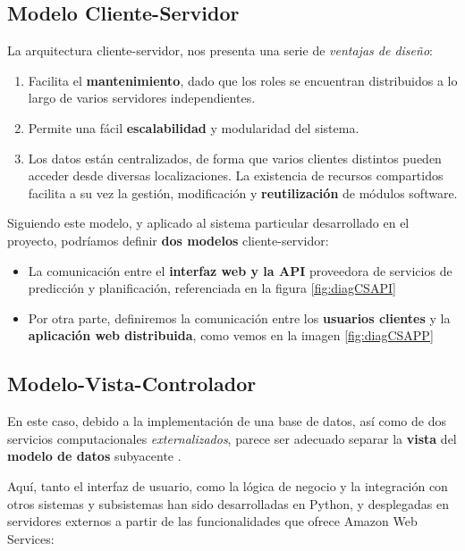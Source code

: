 \subsection{Modelo Cliente-Servidor}

La arquitectura cliente-servidor, nos presenta una serie de \textit{ventajas de diseño}\cite{Rana2022HighDesign}:

\begin{enumerate}[label=\Alph*]
    \item Facilita el \textbf{mantenimiento}, dado que los roles se encuentran distribuidos a lo largo de varios servidores independientes.
    \item Permite una fácil \textbf{escalabilidad} y modularidad del sistema.
    \item Los datos están centralizados, de forma que varios clientes distintos pueden acceder desde diversas localizaciones. La existencia de recursos compartidos facilita a su vez la gestión, modificación y \textbf{reutilización} de módulos software.
\end{enumerate}

Siguiendo este modelo, y aplicado al sistema particular desarrollado en el proyecto, podríamos definir \textbf{dos modelos} cliente-servidor:

\begin{itemize}
    \item La comunicación entre el \textbf{interfaz web y la API} proveedora de servicios de predicción y planificación, referenciada en la figura \ref{fig:diagCSAPI}
    \item Por otra parte, definiremos la comunicación entre los \textbf{usuarios clientes} y la \textbf{aplicación web distribuida}, como vemos en la imagen \ref{fig:diagCSAPP}
\end{itemize}

\subsection{Modelo-Vista-Controlador}

En este caso, debido a la implementación de una base de datos, así como de dos servicios computacionales \textit{externalizados}, parece ser adecuado separar la \textbf{vista} del \textbf{modelo de datos} subyacente \cite{Pop2014DesigningDevelopment}.

Aquí, tanto el interfaz de usuario, como la lógica de negocio y la integración con otros sistemas y subsistemas han sido desarrolladas en Python, y desplegadas en servidores externos a partir de las funcionalidades que ofrece Amazon Web Services:

